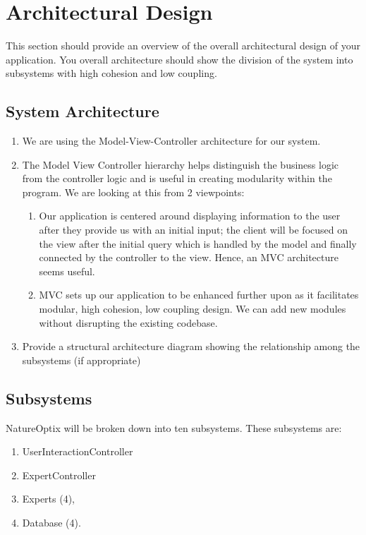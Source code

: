 \documentclass[]{article}
\begin{document}
\section{Architectural Design}
\label{sec:architectural_design}
This section should provide an overview of the overall architectural design of your application. You overall architecture should show the division of the system into subsystems with high cohesion and low coupling.

\subsection{System Architecture}
\label{sub:system_architecture}
\begin{enumerate}[1)]
	\item We are using the Model-View-Controller architecture for our system.
	\item The Model View Controller hierarchy helps distinguish the business logic from the controller logic and is useful in creating modularity within the program. We are looking at this from 2 viewpoints:
	\begin{enumerate}
		\item Our application is centered around displaying information to the user after they provide us with an initial input; the client will be focused on the view after the initial query which is handled by the model and finally connected by the controller to the view. Hence, an MVC architecture seems useful.
		\item MVC sets up our application to be enhanced further upon as it facilitates modular, high cohesion, low coupling design. We can add new modules without disrupting the existing codebase.
	\end{enumerate}
	\item Provide a structural architecture diagram showing the relationship among the subsystems (if appropriate)
\end{enumerate}

\subsection{Subsystems}
\label{sub:subsystems}
NatureOptix will be broken down into ten subsystems. These subsystems are:

\begin{enumerate}
	\item UserInteractionController
	\item ExpertController 
	\item Experts (4),
	\item Database (4).
\end{enumerate}
\end{document}
